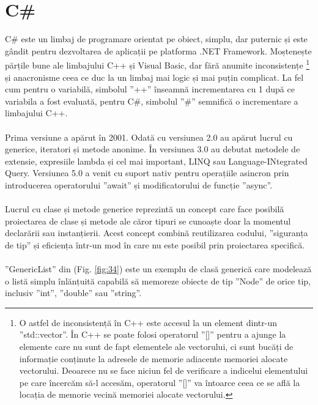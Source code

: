 \section{C\#}
C\# este un limbaj de programare orientat pe obiect, simplu, dar puternic și este gândit pentru dezvoltarea de aplicații pe platforma .NET Framework. Moștenește părțile bune ale limbajului C++ și Visual Basic, dar fără anumite inconsistențe \footnote{O astfel de inconsistență în C++ este accesul la un element dintr-un ”std::vector”. În C++ se poate folosi operatorul ”[]” pentru a ajunge la elemente care nu sunt de fapt elementele ale vectorului, ci sunt bucăți de informație conținute la adresele de memorie adiacente memoriei alocate vectorului. Deoarece nu se face niciun fel de verificare a indicelui elementului pe care încercăm să-l accesăm, operatorul ”[]” va întoarce ceea ce se află la locația de memorie vecină memoriei alocate vectorului.} și anacronisme ceea ce duc la un limbaj mai logic și mai puțin complicat.
La fel cum pentru o variabilă, simbolul ”++” înseamnă incrementarea cu 1 după ce variabila a fost evaluată, pentru C\#, simbolul ”\#” semnifică o incrementare a limbajului C++.
\\ \\
Prima versiune a apărut în 2001. Odată cu versiunea 2.0 au apărut lucrul cu generice, iteratori și metode anonime. În versiunea 3.0 au debutat metodele de extensie, expresiile lambda și cel mai important, LINQ sau Language-INtegrated Query. Versiunea 5.0 a venit cu suport nativ pentru operațiile asincron prin introducerea operatorului ”await” și modificatorului de funcție ”async”.
\\ \\
Lucrul cu clase și metode generice reprezintă un concept care face posibilă proiectarea de clase și metode ale căror tipuri se cunoaște doar la momentul declarării sau instanțierii. Acest concept combină reutilizarea codului, ”siguranța de tip” și eficiența într-un mod în care nu este posibil prin proiectarea specifică.
\\ \\
”GenericList” din (Fig. \ref{fig:34}) este un exemplu de clasă generică care modelează o listă simplu înlănțuită capabilă să memoreze obiecte de tip ”Node” de orice tip, inclusiv ”int”, ”double” sau ”string”.

